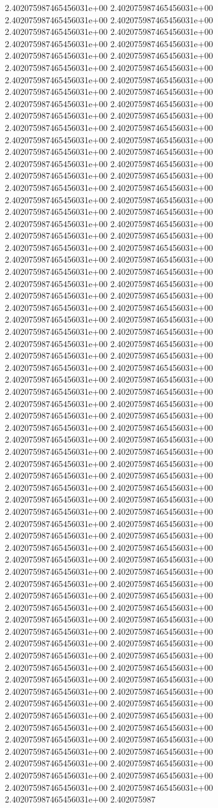 2.402075987465456031e+00	2.402075987465456031e+00	2.402075987465456031e+00	2.402075987465456031e+00	2.402075987465456031e+00	2.402075987465456031e+00	2.402075987465456031e+00	2.402075987465456031e+00	2.402075987465456031e+00	2.402075987465456031e+00	2.402075987465456031e+00	2.402075987465456031e+00	2.402075987465456031e+00	2.402075987465456031e+00	2.402075987465456031e+00	2.402075987465456031e+00	2.402075987465456031e+00	2.402075987465456031e+00	2.402075987465456031e+00	2.402075987465456031e+00	2.402075987465456031e+00	2.402075987465456031e+00	2.402075987465456031e+00	2.402075987465456031e+00	2.402075987465456031e+00	2.402075987465456031e+00	2.402075987465456031e+00	2.402075987465456031e+00	2.402075987465456031e+00	2.402075987465456031e+00	2.402075987465456031e+00	2.402075987465456031e+00	2.402075987465456031e+00	2.402075987465456031e+00	2.402075987465456031e+00	2.402075987465456031e+00	2.402075987465456031e+00	2.402075987465456031e+00	2.402075987465456031e+00	2.402075987465456031e+00	2.402075987465456031e+00	2.402075987465456031e+00	2.402075987465456031e+00	2.402075987465456031e+00	2.402075987465456031e+00	2.402075987465456031e+00	2.402075987465456031e+00	2.402075987465456031e+00	2.402075987465456031e+00	2.402075987465456031e+00	2.402075987465456031e+00	2.402075987465456031e+00	2.402075987465456031e+00	2.402075987465456031e+00	2.402075987465456031e+00	2.402075987465456031e+00	2.402075987465456031e+00	2.402075987465456031e+00	2.402075987465456031e+00	2.402075987465456031e+00	2.402075987465456031e+00	2.402075987465456031e+00	2.402075987465456031e+00	2.402075987465456031e+00	2.402075987465456031e+00	2.402075987465456031e+00	2.402075987465456031e+00	2.402075987465456031e+00	2.402075987465456031e+00	2.402075987465456031e+00	2.402075987465456031e+00	2.402075987465456031e+00	2.402075987465456031e+00	2.402075987465456031e+00	2.402075987465456031e+00	2.402075987465456031e+00	2.402075987465456031e+00	2.402075987465456031e+00	2.402075987465456031e+00	2.402075987465456031e+00	2.402075987465456031e+00	2.402075987465456031e+00	2.402075987465456031e+00	2.402075987465456031e+00	2.402075987465456031e+00	2.402075987465456031e+00	2.402075987465456031e+00	2.402075987465456031e+00	2.402075987465456031e+00	2.402075987465456031e+00	2.402075987465456031e+00	2.402075987465456031e+00	2.402075987465456031e+00	2.402075987465456031e+00	2.402075987465456031e+00	2.402075987465456031e+00	2.402075987465456031e+00	2.402075987465456031e+00	2.402075987465456031e+00	2.402075987465456031e+00	2.402075987465456031e+00	2.402075987465456031e+00	2.402075987465456031e+00	2.402075987465456031e+00	2.402075987465456031e+00	2.402075987465456031e+00	2.402075987465456031e+00	2.402075987465456031e+00	2.402075987465456031e+00	2.402075987465456031e+00	2.402075987465456031e+00	2.402075987465456031e+00	2.402075987465456031e+00	2.402075987465456031e+00	2.402075987465456031e+00	2.402075987465456031e+00	2.402075987465456031e+00	2.402075987465456031e+00	2.402075987465456031e+00	2.402075987465456031e+00	2.402075987465456031e+00	2.402075987465456031e+00	2.402075987465456031e+00	2.402075987465456031e+00	2.402075987465456031e+00	2.402075987465456031e+00	2.402075987465456031e+00	2.402075987465456031e+00	2.402075987465456031e+00	2.402075987465456031e+00	2.402075987465456031e+00	2.402075987465456031e+00	2.402075987465456031e+00	2.402075987